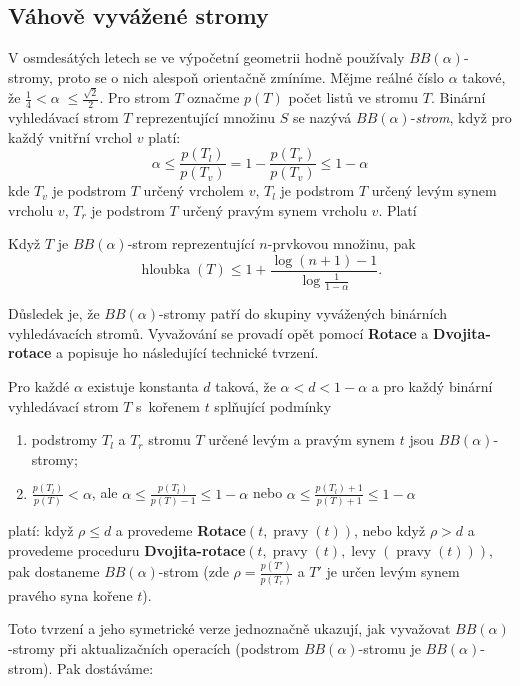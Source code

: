 \documentclass[a4paper,12pt]{article}
\DeclareMathOperator*{\levy}{levy}
\DeclareMathOperator*{\pravy}{pravy}
\DeclareMathOperator*{\hloubka}{hloubka}
\begin{document}
\subsection{Váhově vyvážené stromy}

V osmdesátých letech se ve výpočetní geometrii 
hodně použí\-va\-ly $BB(\alpha )$-stromy, proto se o nich alespoň 
orientačně zmíníme. Mějme reálné číslo $
\alpha$ takové, že 
$\frac 14<\alpha\;\le\frac {\sqrt 2}2$. Pro strom $T$ označme $
p(T)$ počet 
listů ve stromu $T$. Binární vyhledávací strom $T$ 
reprezentující množinu $S$ se nazývá $BB(\alpha )$-\emph{strom}, 
když pro každý vnitřní vrchol $v$ platí:
$$\alpha\le\frac {p(T_l)}{p (T_v)}=1-\frac {p(T_r)}{p(T_v)}\le 1-\alpha$$
kde $T_v$ je podstrom $T$ určený vrcholem $v$, $T_l$ je podstrom 
$T$ určený levým synem vrcholu $v$, $T_r$ je podstrom $T$ 
určený pravým synem vrcholu $v$. Platí

\begin{tvrzeni}Když $T$ je $BB(\alpha )$-strom reprezentující 
$n$-prvkovou množinu, pak 
$$\hloubka(T)\le 1+\frac {\log(n+1)-1}{\log\frac 1{1-\alpha}}.$$
\end{tvrzeni}

Důsledek je, že $BB(\alpha )$-stromy patří do 
skupiny vyvážených binárních vyhledávacích 
stro\-mů.  Vyvažování se provadí opět pomocí 
{\bf Rotace} a {\bf Dvojita-rotace} a popisuje ho následu\-jí\-cí 
technické tvrzení. 

\begin{tvrzeni}Pro každé $\alpha$ existuje konstanta $
d$ 
taková, že $\alpha <d<1-\alpha$ a pro každý binární vyhledávací 
strom $T$ s~kořenem $t$ splňující podmínky
\begin{enumerate}
\item
podstromy $T_l$ a $T_r$ stromu $T$ určené levým a pravým 
synem $t$ jsou $BB(\alpha )$-stromy;
\item
$\frac {p(T_l)}{p(T)}<\alpha$, ale $\alpha\le\frac {
p(T_l)}{p(T)-1}\le 1-\alpha$ nebo $\alpha\le\frac {
p(T_l)+1}{p(T)+1}\le 1-\alpha$
\end{enumerate}
platí:\newline 
když $\rho\le d$ a provedeme {\bf Rotace$(t,\pravy(t))$}, nebo když 
$\rho >d$ a provedeme proceduru {\bf Dvojita-rotace$(t,\pravy(t),\levy(\pravy(t)))$}, pak dostaneme 
$BB(\alpha )$-strom (zde $\rho =\frac {p(T')}{p(T_r
)}$ a $T'$ je určen levým synem 
pravé\-ho syna kořene $t$).  
\end{tvrzeni}

Toto tvrzení a jeho symetrické verze jednoznačně ukazují, 
jak vyvažovat $BB(\alpha )$-stromy při aktualizačních 
operacích (podstrom $BB(\alpha )$-stromu je $BB(\alpha )$-strom). Pak dostáváme:
\end{document}
